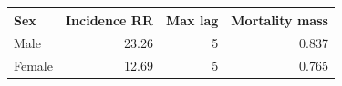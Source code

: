 \begingroup
\renewcommand{\arraystretch}{1.08}
\setlength{\tabcolsep}{4pt}
\begin{tabular}{lrrr}
\toprule
Sex & Incidence RR & Max lag & Mortality mass \\
\midrule
Male & 23.26 & 5 & 0.837 \\
Female & 12.69 & 5 & 0.765 \\
\bottomrule
\end{tabular}
\endgroup
